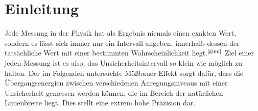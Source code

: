 \section{Einleitung}

Jede Messung in der Physik hat als Ergebnis niemals einen exakten Wert, sondern es lässt sich immer nur ein Intervall angeben, innerhalb dessen der tatsächliche Wert mit einer bestimmten Wahrscheinlichkeit liegt.$^\text{\cite{gum}}$ Ziel einer jeden Messung ist es also, das Unsicherheitsintervall so klein wie möglich zu halten. Der im Folgenden untersuchte Mößbauer-Effekt sorgt dafür, dass die Übergangsenergien zwischen verschiedenen Anregungsniveaus mit einer Unsicherheit gemessen werden können, die im Bereich der natürlichen Linienbreite liegt. Dies stellt eine extrem hohe Präzision dar. 

